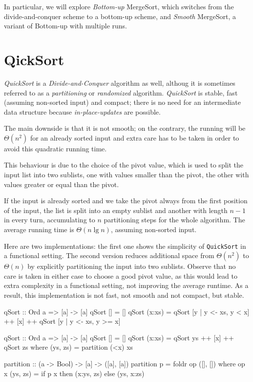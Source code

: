 In particular, we will explore \emph{Bottom-up} MergeSort, which switches from the divide-and-conquer scheme to a bottom-up scheme, and \emph{Smooth} MergeSort, a variant of Bottom-up with multiple runs.

\begin{impl}
\end{impl}

\section{QickSort}

\emph{QuickSort} is a \emph{Divide-and-Conquer} algorithm as well, althoug it is sometimes referred to as a \emph{partitioning} or \emph{randomized} algorithm.
\emph{QuickSort} is stable, fast (assuming non-sorted input) and compact; there is no need for an intermediate data structure because \emph{in-place-updates} are possible.

The main downside is that it is not smooth; on the contrary, the running will be $\Theta (n^2)$ for an already sorted input and extra care has to be taken in order to avoid this quadratic running time.

This behaviour is due to the choice of the pivot value, which is used to split the input list into two sublists, one with values smaller than the pivot, the other with values greater or equal than the pivot.

If the input is already sorted and we take the pivot always from the first position of the input, the list is split into an empty sublist and another with length $n-1$ in every turn, accumulating to $n$ partitioning steps for the whole algorithm.
The average running time is $\Theta (n \lg n)$, assuming non-sorted input.

\begin{impl} \label{impl:qshaskell}
Here are two implementations: the first one shows the simplicity of \texttt{QuickSort} in a functional setting.
The second version reduces additional space from $\Theta (n^2)$ to $\Theta (n)$ by explicitly partitioning the input into two sublists.
Observe that no care is taken in either case to choose a good pivot value, as this would lead to extra complexity in a functional setting, not improving the average runtime. As a result, this implementation is not fast, not smooth and not compact, but stable.
\end{impl}

\begin{haskellcode}
  qSort :: Ord a => [a] -> [a]
  qSort [] = []
  qSort (x:xs) = qSort [y | y <- xs, y < x] ++ [x] ++
                 qSort [y | y <- xs, y >= x]

  qSort :: Ord a => [a] -> [a]
  qSort [] = []
  qSort (x:xs) = qSort ys ++ [x] ++ qSort zs
      where (ys, zs) = partition (<x) xs

  partition :: (a -> Bool) -> [a] -> ([a], [a])
  partition p = foldr op ([], [])
      where op x (ys, zs) = if p x then (x:ys, zs) else (ys, x:zs)
\end{haskellcode}


